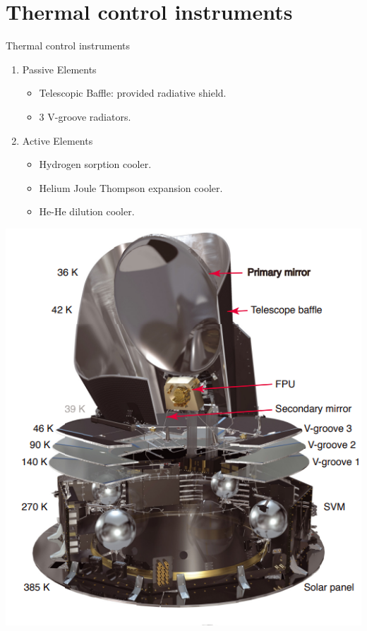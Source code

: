 \documentclass{cubeamer}
\begin{document}
\section{Thermal control instruments}
\begin{frame}{Thermal control instruments}

    
    \begin{minipage}{0.5\textwidth}

   \begin{enumerate}
       \item Passive Elements
         \begin{itemize}
         \item Telescopic Baffle: provided radiative shield.
         \item 3 V-groove radiators.
         \end{itemize}
         \item Active Elements
         \begin{itemize}
         \item Hydrogen sorption cooler.
         \item Helium Joule Thompson expansion cooler.
         \item He-He dilution cooler.

         \end{itemize}
    \end{enumerate}
    \end{minipage}
    \begin{minipage}{0.45\textwidth}
    \includegraphics[width=0.9\linewidth]{Figures/cut_T_view.png} 
    \end{minipage}
\end{frame}
\end{document}
